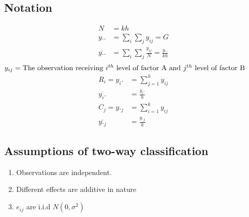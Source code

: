 \documentclass[oneside,11pt,pdftex]{book}%
\numberwithin{equation}{section}
\numberwithin{section}{chapter}
\numberwithin{equation}{chapter}
\begin{document}
\subsection{Notation}
\begin{align*}
	N&=kh\\
	y..&=\sum_i \sum_j y_{ij}=G\\
	\overline{y..}&=\sum_i \sum_j \frac{y_{ij}}{N}=\frac{y..}{kh}\\
\end{align*}
$y_{ij}=\text{The observation receiving $ i^{th} $ level of factor A and $ j^{th} $ level of factor B}$
\begin{align*}
	R_i=y_i.&=\sum_{j=1}^{h}y_{ij}\\
	\overline{y_i.}&=\frac{y_i.}{h}\\
	C_j=y._j&=\sum_{i=1}^k y_{ij}\\
	\overline{y._j}&=\frac{y._j}{k}
\end{align*}

\subsection{Assumptions of two-way classification}
\begin{enumerate}
	\item Observations are independent.
	\item Different effects are additive in nature
	\item $ e_{ij} $ are i.i.d $ N(0,\sigma^2) $
\end{enumerate}
\end{document}
